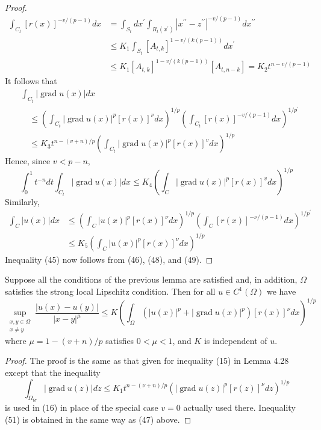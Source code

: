 \begin{proof}
\[\begin{aligned}
  \int_{C_t}[r(x)]^{-v /(p-1)} d x & =\int_{S_t} d x^{\prime} \int_{R_t\left(x^{\prime}\right)}\left|x^{\prime \prime}-z^{\prime \prime}\right|^{-v /(p-1)} d x^{\prime \prime} \\
  & \leq K_1 \int_{S_t}\left[A_{t, k}\right]^{1-v /(k(p-1))} d x^{\prime} \\
  & \leq K_1\left[A_{t, k}\right]^{1-v /(k(p-1))}\left[A_{t, n-k}\right]=K_2 t^{n-v /(p-1)}
  \end{aligned}
  \]
  It follows that
  \[
  \begin{aligned}
  & \int_{C_t}|\operatorname{grad} u(x)| d x \\
  & \quad \leq\left(\int_{C_t}|\operatorname{grad} u(x)|^p[r(x)]^\nu d x\right)^{1 / p}\left(\int_{C_t}[r(x)]^{-v /(p-1)} d x\right)^{1 / p^{\prime}} \\
  & \quad \leq K_3 t^{n-(v+n) / p}\left(\int_{C_t}|\operatorname{grad} u(x)|^p[r(x)]^v d x\right)^{1 / p}
  \end{aligned}
  \]
  Hence, since $v<p-n$,
  \[
  \int_0^1 t^{-n} d t \int_{C_t}|\operatorname{grad} u(x)| d x \leq K_4\left(\int_C|\operatorname{grad} u(x)|^p[r(x)]^v d x\right)^{1 / p}
  \]
  Similarly,
  \[
  \begin{aligned}
  \int_C|u(x)| d x & \leq\left(\int_C|u(x)|^p[r(x)]^\nu d x\right)^{1 / p}\left(\int_C[r(x)]^{-\nu /(p-1)} d x\right)^{1 / p^{\prime}} \\
  & \leq K_5\left(\int_C|u(x)|^p[r(x)]^\nu d x\right)^{1 / p}
  \end{aligned}
  \]
  Inequality (45) now follows from (46), (48), and (49).
\end{proof}


\begin{lemma}
  Suppose all the conditions of the previous lemma are satisfied and, in addition, $\Omega$ satisfies the strong local Lipschitz condition. Then for all $u \in C^1(\Omega)$ we have
  \[
  \sup _{\substack{x, y \in \Omega \\ x \neq y}} \frac{|u(x)-u(y)|}{|x-y|^\mu} \leq K\left(\int_{\Omega}\left(|u(x)|^p+|\operatorname{grad} u(x)|^p\right)[r(x)]^\nu d x\right)^{1 / p}
  \]
  where $\mu=1-(v+n) / p$ satisfies $0<\mu<1$, and $K$ is independent of $u$.
\end{lemma}

\begin{proof}
  The proof is the same as that given for inequality (15) in Lemma 4.28 except that the inequality
  \[
  \int_{\Omega_{t \sigma}}|\operatorname{grad} u(z)| d z \leq K_1 t^{n-(\nu+n) / p}\left(|\operatorname{grad} u(z)|^p[r(z)]^\nu d z\right)^{1 / p}
  \]
  is used in (16) in place of the special case $v=0$ actually used there. Inequality (51) is obtained in the same way as (47) above.
\end{proof}



